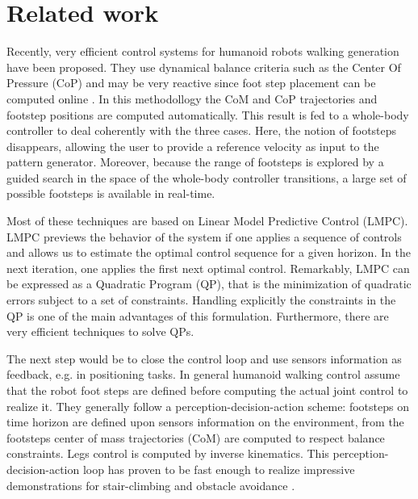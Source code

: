 
\chapter{Related work} 
\label{Chap:Related-Work}

Recently, very efficient control systems for humanoid robots walking generation have been proposed.
They use dynamical balance criteria such as the Center Of Pressure (CoP) and may be very reactive since foot step placement can be computed online \citep{HerdtAR2010}. In this methodollogy the CoM and CoP trajectories and footstep positions are computed automatically. This result is fed to a whole-body controller to deal coherently with the three cases. Here, the notion of footsteps disappears, allowing the user to provide a reference velocity as input to the pattern generator. Moreover, because the range of footsteps is explored by a guided search in the space of the whole-body controller transitions, a large set of possible footsteps is available in real-time.

Most of these techniques are based on Linear Model Predictive Control (LMPC). LMPC previews the behavior of the system if one applies a sequence of controls and allows us to estimate the optimal control sequence for a given horizon. In the next iteration, one applies the first next optimal control. Remarkably, LMPC can be expressed as a Quadratic Program (QP), that is the minimization of quadratic errors subject to a set of constraints.
Handling explicitly the constraints in the QP is one of the main advantages of this formulation. 
Furthermore, there are very efficient techniques to solve QPs.

The next step would be to close the control loop and use sensors information as feedback, e.g. in positioning tasks. In general humanoid walking control assume that the robot foot steps are defined before computing the actual joint control to realize it. They generally follow a perception-decision-action scheme: footsteps on time horizon are defined upon sensors information on the environment, from the footsteps center of mass trajectories (CoM) are computed to respect balance constraints. Legs control is computed by inverse kinematics. This perception-decision-action loop has proven to be fast enough to realize impressive demonstrations for stair-climbing and obstacle avoidance \citep{Lorch02,Chestnutt07,Michel07,Guttmann08}. 


